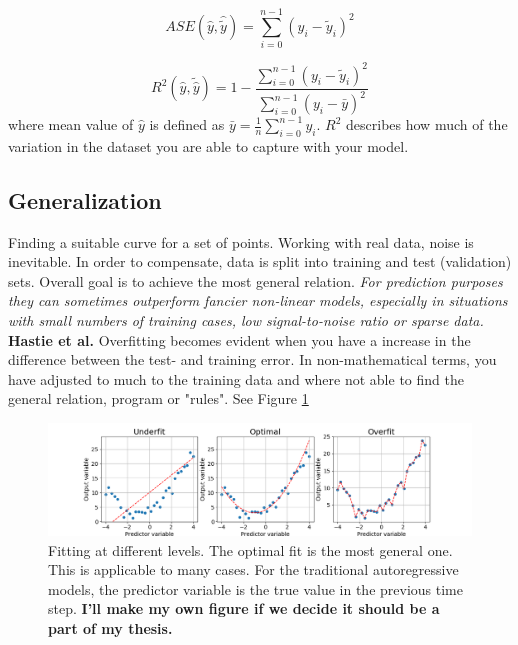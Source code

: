 \documentclass{article}
\begin{document}
\begin{equation} \label{eq:ase}
    ASE(\hat{y},\hat{\tilde{y}}) =  \sum_{i=0}^{n-1}(y_i-\tilde{y}_i)^2
\end{equation} 

\begin{equation} \label{eq:r2}
    R^2(\hat{y}, \tilde{\hat{y}}) = 1 - \frac{\sum_{i=0}^{n - 1} (y_i - \tilde{y}_i)^2}{\sum_{i=0}^{n - 1} (y_i - \bar{y})^2}
\end{equation} 
where mean value of $\hat{y}$ is defined as $\bar{y} =  \frac{1}{n} \sum_{i=0}^{n - 1} y_i$. $R^2$ describes how much of the variation in the dataset you are able to capture with your model.

\subsection{Generalization} \label{sec:generalization}
Finding a suitable curve for a set of points. Working with real data, noise is inevitable. In order to compensate, data is split into training and test (validation) sets. %
Overall goal is to achieve the most general relation. \textit{For prediction purposes they can sometimes outperform fancier non-linear models, especially in situations with small numbers of training cases, low signal-to-noise ratio or sparse data.} \textbf{Hastie et al.} Overfitting becomes evident when you have a increase in the difference between the test- and training error. In non-mathematical terms, you have adjusted to much to the training data and where not able to find the general relation, program or "rules". See Figure \ref{fig:linreg_overfitting} 

\begin{figure}[hp]
    \centering
    \includegraphics[scale = 0.5]{generalization.png}
    \caption{Fitting at different levels. The optimal fit is the most general one. This is applicable to many cases. For the traditional autoregressive models, the predictor variable is the true value in the previous time step. \textbf{I'll make my own figure if we decide it should be a part of my thesis.}}
    \label{fig:linreg_overfitting}
\end{figure}
\end{document}
